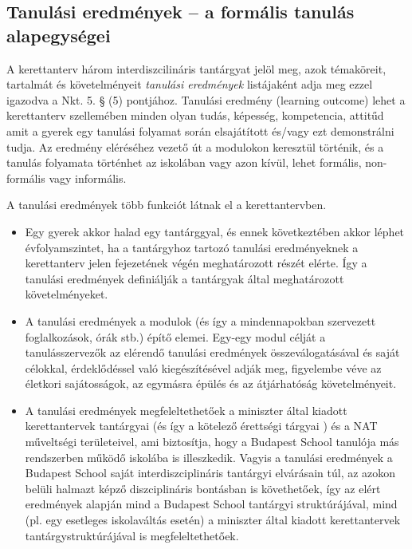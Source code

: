 \subsection{Tanulási eredmények -- a formális tanulás alapegységei}
\label{sec:tanulasi_eredmenyek}
A kerettanterv három interdiszcilináris tantárgyat jelöl meg, azok
témaköreit, tartalmát és követelményeit \emph{tanulási eredmények}
listájaként adja meg ezzel igazodva a Nkt. 5. § (5) pontjához. Tanulási
eredmény (learning outcome) lehet a kerettanterv szellemében minden
olyan tudás, képesség, kompetencia, attitűd amit a gyerek egy tanulási
folyamat során elsajátított és/vagy ezt demonstrálni tudja. Az eredmény
eléréséhez vezető út a modulokon keresztül történik, és a tanulás
folyamata történhet az iskolában vagy azon kívül, lehet formális,
non-formális vagy informális.

A tanulási eredmények több funkciót látnak el a kerettantervben.

\begin{itemize}

  \item Egy gyerek akkor halad egy tantárggyal, és ennek következtében akkor
        léphet évfolyamszintet, ha a tantárgyhoz tartozó
        tanulási  eredményeknek a kerettanterv jelen fejezetének
        végén meghatározott  részét elérte. Így a tanulási
        eredmények definiálják a tantárgyak  által meghatározott
        követelményeket.
  \item A tanulási eredmények a modulok (és így a mindennapokban szervezett
        foglalkozások, órák stb.) építő elemei. Egy-egy modul
        célját a  tanulásszervezők az elérendő tanulási
        eredmények  összeválogatásával és saját célokkal,
        érdeklődéssel való  kiegészítésével adják meg,
        figyelembe véve az életkori  sajátosságok, az egymásra
        épülés és az átjárhatóság  követelményeit.
  \item A tanulási eredmények megfeleltethetőek a miniszter által kiadott
        kerettantervek tantárgyai (és így a kötelező érettségi
        tárgyai )  és a NAT műveltségi területeivel, ami
        biztosítja, hogy a Budapest  School tanulója más
        rendszerben működő iskolába is illeszkedik.  Vagyis a
        tanulási eredmények a Budapest School saját
        interdiszciplináris tantárgyi elvárásain túl, az azokon belüli
        halmazt képző diszciplináris bontásban is követhetőek,
        így az  elért eredmények alapján mind a Budapest School
        tantárgyi  struktúrájával, mind (pl. egy esetleges
        iskolaváltás esetén) a  miniszter által kiadott
        kerettantervek tantárgystruktúrájával is
        megfeleltethetőek.
\end{itemize}

